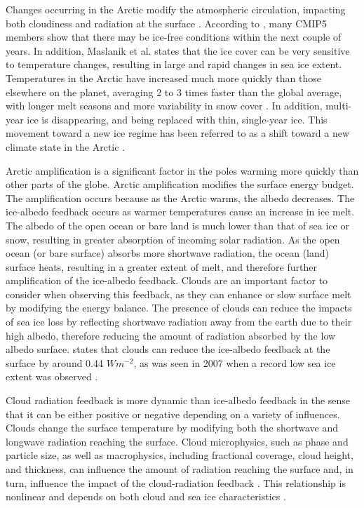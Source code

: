 Changes occurring in the Arctic modify the atmospheric circulation, impacting both cloudiness and radiation at the surface \citep{zhang:2008}. According to \citet{stroeve:2007}, many CMIP5 members show that there may be ice-free conditions within the next couple of years. In addition, Maslanik et al. \citep{maslanik:2007} states that the ice cover can be very sensitive to temperature changes, resulting in large and rapid changes in sea ice extent. Temperatures in the Arctic have increased much more quickly than those elsewhere on the planet, averaging 2 to 3 times faster than the global average, with longer melt seasons and more variability in snow cover \citep{sledd:2019, AACI:05}. In addition, multi-year ice is disappearing, and being replaced with thin, single-year ice. This movement toward a new ice regime has been referred to as a shift toward a new climate state in the Arctic \citep{verlinde:2007}.  

Arctic amplification is a significant factor in the poles warming more quickly than other parts of the globe. Arctic amplification modifies the surface energy budget. The amplification occurs because as the Arctic warms, the albedo decreases. The ice-albedo feedback occurs as warmer temperatures cause an increase in ice melt. The albedo of the open ocean or bare land is much lower than that of sea ice or snow, resulting in greater absorption of incoming solar radiation. As the open ocean (or bare surface) absorbs more shortwave radiation, the ocean (land) surface heats, resulting in a greater extent of melt, and therefore further amplification of the ice-albedo feedback. Clouds are an important factor to consider when observing this feedback, as they can enhance or slow surface melt by modifying the energy balance. The presence of clouds can reduce the impacts of sea ice loss by reflecting shortwave radiation away from the earth due to their high albedo, therefore reducing the amount of radiation absorbed by the low albedo surface. \citet{hwang:2018} states that clouds can reduce the ice-albedo feedback at the surface by around 0.44 $Wm^{-2}$, as was seen in 2007 when a record low sea ice extent was observed \citep{hwang:2018, sledd:2019}.

Cloud radiation feedback is more dynamic than ice-albedo feedback in the sense that it can be either positive or negative depending on a variety of influences. Clouds change the surface temperature by modifying both the shortwave and longwave radiation reaching the surface. Cloud microphysics, such as phase and particle size, as well as macrophysics, including fractional coverage, cloud height, and thickness, can influence the amount of radiation reaching the surface and, in turn, influence the impact of the cloud-radiation feedback \citep{uttal:2002}. This relationship is nonlinear and depends on both cloud and sea ice characteristics \citep{intrieri:2002}.

